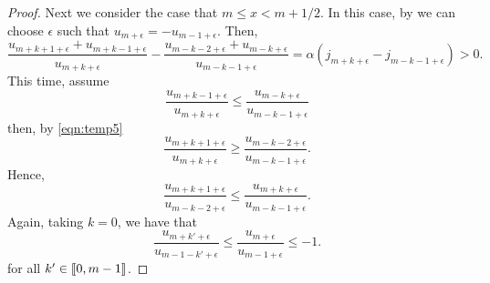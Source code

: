 \begin{proof}
      Next we consider the case that $m \leq x < m+1/2$. In this case, by  we can choose $\epsilon$ such that $u_{m+\epsilon} = -u_{m-1+\epsilon}$. Then,
      \begin{equation}\label{eqn:temp5}
      	\frac{u_{m+k+1+\epsilon}+u_{m+k-1+\epsilon}}{u_{m+k+\epsilon}} - \frac{u_{m-k-2+\epsilon}+u_{m-k+\epsilon}}{u_{m-k-1+\epsilon}} = \alpha(j_{m+k+\epsilon}-j_{m-k-1+\epsilon}) > 0.
      \end{equation}
      This time, assume
      \begin{equation}\label{eqn:assumption_2}
      	\frac{u_{m+k-1+\epsilon}}{u_{m+k+\epsilon}} \leq \frac{u_{m-k+\epsilon}}{u_{m-k-1+\epsilon}}
      \end{equation}
      then, by \cref{eqn:temp5}
      \begin{equation}
      	\frac{u_{m+k+1+\epsilon}}{u_{m+k+\epsilon}} \geq \frac{u_{m-k-2+\epsilon}}{u_{m-k-1+\epsilon}}.
      \end{equation}
      Hence,
      \begin{equation}
      	\frac{u_{m+k+1+\epsilon}}{u_{m-k-2+\epsilon}} \leq \frac{u_{m+k+\epsilon}}{u_{m-k-1+\epsilon}}.
      \end{equation}
      Again, taking $k=0$, we have that
      \begin{equation}
      	\frac{u_{m+k'+\epsilon}}{u_{m-1-k'+\epsilon}} \leq \frac{u_{m+\epsilon}}{u_{m-1+\epsilon}} \leq -1.
      \end{equation}
      for all $k' \in \left \llbracket 0 , m-1 \right \rrbracket$.
    \end{proof}

